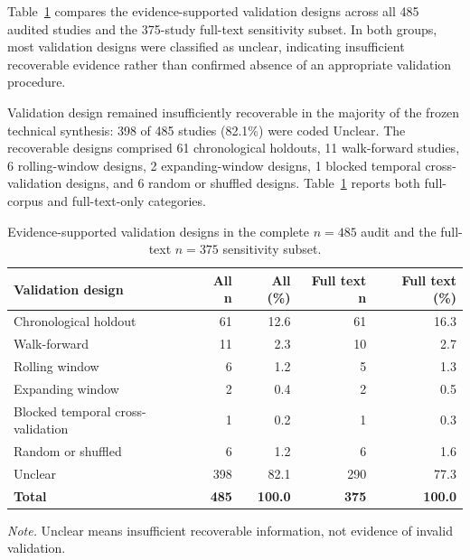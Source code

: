 \documentclass[pdflatex,sn-mathphys-num]{sn-jnl}%
\theoremstyle{thmstyleone}%
\theoremstyle{thmstyletwo}%
\theoremstyle{thmstylethree}%
\begin{document}
Table~\ref{tab:validation-designs} compares the evidence-supported
validation designs across all 485 audited studies and the
375-study full-text sensitivity subset. In both groups, most
validation designs were classified as unclear, indicating
insufficient recoverable evidence rather than confirmed absence
of an appropriate validation procedure.

Validation design remained insufficiently recoverable in the majority
of the frozen technical synthesis: 398 of 485 studies
(82.1\%) were coded Unclear. The recoverable designs
comprised 61 chronological holdouts,
11 walk-forward studies, 6
rolling-window designs, 2 expanding-window
designs, 1 blocked temporal cross-validation designs,
and 6 random or shuffled designs.
Table~\ref{tab:validation-designs} reports both full-corpus and
full-text-only categories.

\begin{table}[!htbp]
\centering
\caption{Evidence-supported validation designs in the complete $n=485$ audit and the full-text $n=375$ sensitivity subset.}
\label{tab:validation-designs}
\small
\setlength{\tabcolsep}{4pt}
\renewcommand{\arraystretch}{1.12}
\begin{tabular}{lrrrr}
\toprule
Validation design & All n & All (\%) & Full text n & Full text (\%) \\
\midrule
Chronological holdout & 61 & 12.6 & 61 & 16.3 \\
Walk-forward & 11 & 2.3 & 10 & 2.7 \\
Rolling window & 6 & 1.2 & 5 & 1.3 \\
Expanding window & 2 & 0.4 & 2 & 0.5 \\
Blocked temporal cross-validation & 1 & 0.2 & 1 & 0.3 \\
Random or shuffled & 6 & 1.2 & 6 & 1.6 \\
Unclear & 398 & 82.1 & 290 & 77.3 \\
\textbf{Total} & \textbf{485} & \textbf{100.0} & \textbf{375} & \textbf{100.0} \\
\bottomrule
\end{tabular}

\vspace{1mm}
\begin{minipage}{0.97\linewidth}
\footnotesize
\textit{Note.} Unclear means insufficient recoverable information, not evidence of invalid validation.
\end{minipage}
\end{table}

\FloatBarrier
\end{document}
